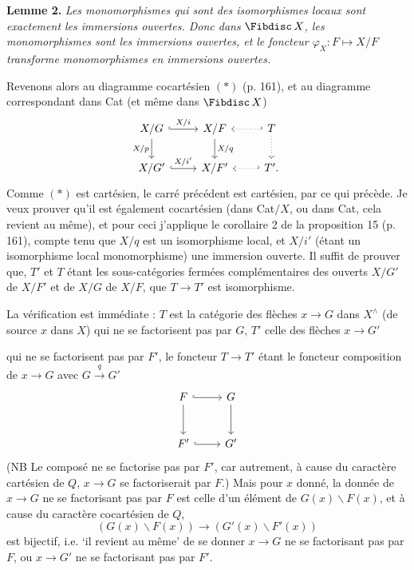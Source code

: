 \textbf{Lemme 2.} \textit{Les monomorphismes qui sont des isomorphismes locaux sont exactement les immersions ouvertes. Donc dans} $\Fibdisc\, X$\textit{, les monomorphismes sont les immersions ouvertes, et le foncteur $\varphi_X : F \longmapsto X/F$ transforme monomorphismes en immersions ouvertes.}

Revenons alors au diagramme cocartésien $(*)$ (p. 161), et au diagramme correspondant dans Cat (et même dans $\Fibdisc\, X$)
\[
\begin{tikzcd}
X/G \ar[r, hook, "X/i"] \ar[d, "X/p"'] & X/F \ar[d, "X/q"] & T \ar[l, hook', dotted] \ar[d, dotted] \\
X/G' \ar[r, hook, "X/i'"] & X/F' & T'. \ar[l, hook', dotted]
\end{tikzcd}
\]
Comme $(*)$ est cartésien, le carré précédent est cartésien, par ce qui précède. Je veux prouver qu'il est également cocartésien
(dans Cat$/X$, ou dans Cat, cela revient au même), et pour ceci j'applique le corollaire 2 de la proposition 15 (p. 161), compte tenu que $X/q$ est un isomorphisme local, et $X/i'$ (étant un isomorphisme local monomorphisme) une immersion ouverte. Il suffit de prouver que, $T'$ et $T$ étant les sous-catégories fermées complémentaires des ouverts $X/G'$ de $X/F'$ et de $X/G$ de $X/F$, que $T \longrightarrow T'$ est isomorphisme.

{\small} %

La vérification est immédiate : $T$ est la catégorie des flèches $x \longrightarrow G$ dans $X^{\wedge}$ (de source $x$ dans $X$) qui ne se factorisent pas par $G$, $T'$ celle des flèches $x \longrightarrow G'$

qui ne se factorisent pas par $F'$, le foncteur $T \longrightarrow T'$ étant le foncteur composition de $x \longrightarrow G$ avec $G \xrightarrow{q} G'$
\[
\begin{tikzcd}[row sep=large]
F \arrow[r, hook] \arrow[d] & G \arrow[d] \\
F' \arrow[r, hook] & G'
\end{tikzcd}
\]
(NB Le composé ne se factorise pas par $F'$, car autrement, à cause du caractère cartésien de $Q$, $x \longrightarrow G$ se factoriserait par $F$.) Mais pour $x$ donné, la donnée de $x \longrightarrow G$ ne se factorisant pas par $F$ est celle d’un élément  de $G(x)\backslash F(x)$, et à cause du caractère cocartésien de $Q$,
\[
(G(x)\backslash F(x)) \longrightarrow (G'(x)\backslash F'(x))
\]
est bijectif, i.e. ‘il revient au même’ de se donner $x \longrightarrow G$ ne se factorisant pas par $F$, ou $x \longrightarrow G'$ ne se factorisant pas par $F'$.

